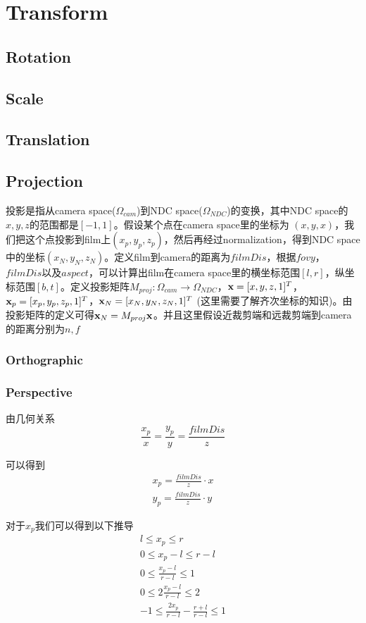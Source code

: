 \section{Transform}
\subsection{Rotation}
\subsection{Scale}
\subsection{Translation}
\subsection{Projection}
投影是指从camera space($\Omega_{cam}$)到NDC space($\Omega_{NDC}$)的变换，其中NDC space的$x,y,z$的范围都是$[-1,1]$。假设某个点在camera space里的坐标为 $(x,y,x)$，我们把这个点投影到film上$(x_p,y_p,z_p)$，然后再经过normalization，得到NDC space中的坐标$(x_N, y_N,z_N)$。定义film到camera的距离为$filmDis$，根据$fovy$，$filmDis$以及$aspect$，可以计算出film在camera space里的横坐标范围$[l,r]$，纵坐标范围$[b,t]$。定义投影矩阵$M_{proj}: \Omega_{cam}\to \Omega_{NDC}$，$\bold{x} = [x, y, z, 1]^T$，$\bold{x}_p = [x_p, y_p, z_p, 1]^T$，$\bold{x}_N = [x_N, y_N, z_N, 1]^T$ (这里需要了解齐次坐标的知识)。由投影矩阵的定义可得$\bold{x}_N = M_{proj}\bold{x}$。并且这里假设近裁剪端和远裁剪端到camera的距离分别为$n,f$
\subsubsection{Orthographic}
\subsubsection{Perspective}
由几何关系
\begin{displaymath}
\frac{x_p}{x} = \frac{y_p}{y} = \frac{filmDis}{z}
\end{displaymath}

可以得到
\begin{gather*}
x_p = \frac{filmDis}{z} \cdot x\\
y_p = \frac{filmDis}{z} \cdot y
\end{gather*}

对于$x_p$我们可以得到以下推导
\begin{gather*}
l \leq x_p \leq r\\
0 \leq x_p - l \leq r-l\\
0 \leq \frac{x_p - l}{r - l} \leq 1\\
0 \leq 2\frac{x_p - l}{r - l} \leq 2\\
-1 \leq \frac{2 x_p}{r-l} - \frac{r + l}{r - l} \leq 1
\end{gather*}

